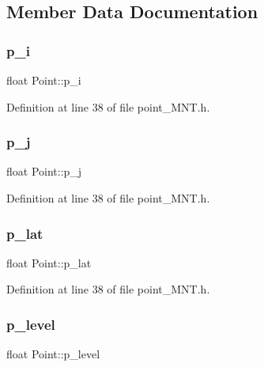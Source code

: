 \subsection{Member Data Documentation}
\mbox{\label{class_point_add37feb7f6e9ccb3d5ba201d82b7f7a7}} 
\subsubsection{\texorpdfstring{p\+\_\+i}{p\_i}}
{\footnotesize\ttfamily float Point\+::p\+\_\+i}



Definition at line 38 of file point\+\_\+\+M\+N\+T.\+h.

\mbox{\label{class_point_a53ddf5fde2dd3c2e68cf64bc6ebd6951}} 
\subsubsection{\texorpdfstring{p\+\_\+j}{p\_j}}
{\footnotesize\ttfamily float Point\+::p\+\_\+j}



Definition at line 38 of file point\+\_\+\+M\+N\+T.\+h.

\mbox{\label{class_point_a358899abd4e51fdd5322b76a8324ef90}} 
\subsubsection{\texorpdfstring{p\+\_\+lat}{p\_lat}}
{\footnotesize\ttfamily float Point\+::p\+\_\+lat}



Definition at line 38 of file point\+\_\+\+M\+N\+T.\+h.

\mbox{\label{class_point_a40457fd9b36c4414907fa67d8d99f119}} 
\subsubsection{\texorpdfstring{p\+\_\+level}{p\_level}}
{\footnotesize\ttfamily float Point\+::p\+\_\+level}



